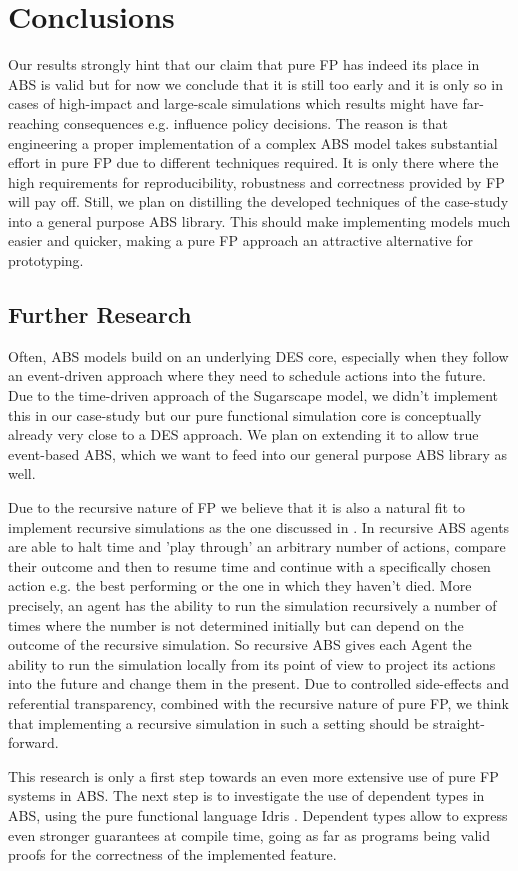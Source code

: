 \section{Conclusions}
\label{sec:conclusions}
Our results strongly hint that our claim that pure FP has indeed its place in ABS is valid but for now we conclude that it is still too early and it is only so in cases of high-impact and large-scale simulations which results might have far-reaching consequences e.g. influence policy decisions. The reason is that engineering a proper implementation of a complex ABS model takes substantial effort in pure FP due to different techniques required. It is only there where the high requirements for reproducibility, robustness and correctness provided by FP will pay off. Still, we plan on distilling the developed techniques of the case-study into a general purpose ABS library. This should make implementing models much easier and quicker, making a pure FP approach an attractive alternative for prototyping.

\subsection{Further Research}
Often, ABS models build on an underlying DES core, especially when they follow an event-driven approach \cite{meyer_event-driven_2014} where they need to schedule actions into the future. Due to the time-driven approach of the Sugarscape model, we didn't implement this in our case-study but our pure functional simulation core is conceptually already very close to a DES approach. We plan on extending it to allow true event-based ABS, which we want to feed into our general purpose ABS library as well.

Due to the recursive nature of FP we believe that it is also a natural fit to implement recursive simulations as the one discussed in \cite{gilmer_recursive_2000}. In recursive ABS agents are able to halt time and 'play through' an arbitrary number of actions, compare their outcome and then to resume time and continue with a specifically chosen action e.g. the best performing or the one in which they haven't died. More precisely, an agent has the ability to run the simulation recursively a number of times where the number is not determined initially but can depend on the outcome of the recursive simulation. So recursive ABS gives each Agent the ability to run the simulation locally from its point of view to project its actions into the future and change them in the present. Due to controlled side-effects and referential transparency, combined with the recursive nature of pure FP, we think that implementing a recursive simulation in such a setting should be straight-forward.

This research is only a first step towards an even more extensive use of pure FP systems in ABS. The next step is to investigate the use of dependent types in ABS, using the pure functional language Idris \cite{brady_idris_2013}. Dependent types allow to express even stronger guarantees at compile time, going as far as programs being valid proofs for the correctness of the implemented feature.